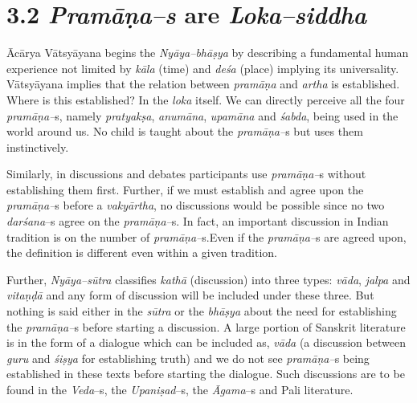 \vspace{-.3cm}

\section*{3.2 \textit{Pramāṇa–s} are \textit{Loka–siddha}}

\vspace{-.2cm}

Ācārya Vātsyāyana begins the \textit{Nyāya–bhāṣya} by describing a fundamental human experience not limited by \textit{kāla }(time) and \textit{deśa }(place) implying its universality. Vātsyāyana implies that the relation between \textit{pramāṇa} and \textit{artha} is established. Where is this established? In the \textit{loka }itself. We can directly perceive all the four \textit{pramāṇa–}s, namely \textit{pratyakṣa}, \textit{anumāna}, \textit{upamāna} and \textit{śabda}, being used in the world around us. No child is taught about the \textit{pramāṇa–}s but uses them instinctively.

Similarly, in discussions and debates participants use \textit{pramāṇa–}s without establishing them first. Further, if we must establish and agree upon the \textit{pramāṇa–}s before a \textit{vakyārtha}, no discussions would be possible since no two \textit{darśana}–s agree on the \textit{pramāṇa–}s. In fact, an important discussion in Indian tradition is on the number of \textit{pramāṇa–}s.\break Even if the \textit{pramāṇa–}s are agreed upon, the definition is different even within a given tradition.

Further,\textit{ Nyāya–sūtra} classifies \textit{kathā} (discussion) into three types: \textit{vāda}, \textit{jalpa} and \textit{vitaṇḍā} and any form of discussion will be included under these three. But nothing is said either in the \textit{sūtra} or the \textit{bhāṣya }about the need for establishing the \textit{pramāṇa–}s before starting a discussion. A large portion of Sanskrit literature is in the form of a dialogue which can be included as, \textit{vāda }(a discussion between \textit{guru} and \textit{śiṣya} for establishing truth) and we do not see \textit{pramāṇa–}s being established in these texts before starting the dialogue. Such discussions are to be found in the \textit{Veda}–s, the \textit{Upaniṣad}–s, the \textit{Āgama}–s and Pali literature.

